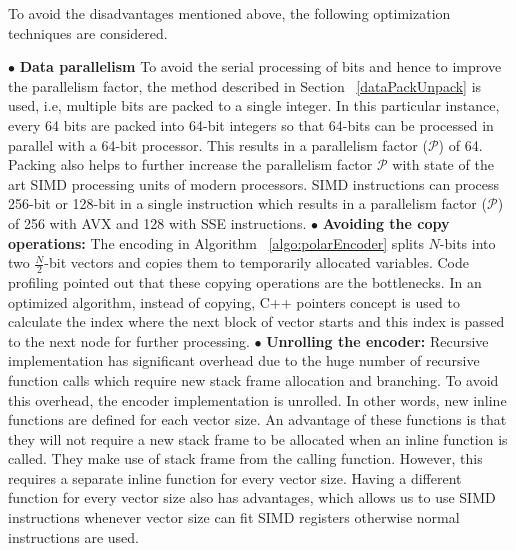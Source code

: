 To avoid the disadvantages mentioned above, the following optimization techniques are considered.

$\bullet$ \textbf{Data parallelism} To avoid the serial processing of bits and hence to improve the parallelism factor, the method described in Section ~\ref{dataPackUnpack} is used, i.e, multiple bits are packed to a single integer. In this particular instance, every 64 bits are packed into 64-bit integers so that 64-bits can be processed in parallel with a 64-bit processor. This results in a parallelism factor ($\mathcal{P}$) of 64. Packing also helps to further increase the parallelism factor $\mathcal{P}$ with state of the art SIMD processing units of modern processors. SIMD instructions can process 256-bit or 128-bit in a single instruction which results in a parallelism factor ($\mathcal{P}$) of 256 with AVX and 128 with SSE instructions. \newline
\newline
$\bullet$ \textbf{Avoiding the copy operations:} The encoding in Algorithm ~\ref{algo:polarEncoder} splits $N$-bits into two $\frac{N}{2}$-bit vectors and copies them to temporarily allocated variables. Code profiling pointed out that these copying operations are the bottlenecks. In an optimized algorithm, instead of copying, C++ pointers concept is used to calculate the index where the next block of vector starts and this index is passed to the next node for further processing. \newline
\newline
$\bullet$ \textbf{Unrolling the encoder:} Recursive implementation has significant overhead due to the huge number of recursive function calls which require new stack frame allocation and branching. To avoid this overhead, the encoder implementation is unrolled. In other words, new inline functions are defined for each vector size. An advantage of these functions is that they will not require a new stack frame to be allocated when an inline function is called. They make use of stack frame from the calling function. However, this requires a separate inline function for every vector size. Having a different function for every vector size also has advantages, which allows us to use SIMD instructions whenever vector size can fit SIMD registers otherwise normal instructions are used. \newline
\newline
